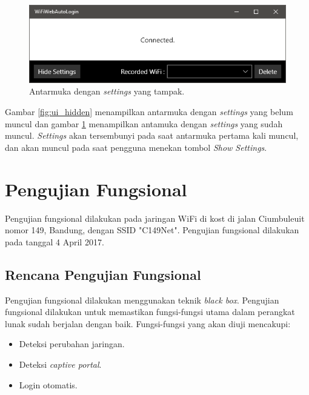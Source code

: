 \begin{figure}[!htb]
    \centering
    \includegraphics[scale=0.9]{Gambar/ui_shown.png}
    \caption[Antarmuka dengan \textit{settings} yang tampak.]{Antarmuka dengan \textit{settings} yang tampak.} 
    \label{fig:ui_shown}
\end{figure}

Gambar \ref{fig:ui_hidden} menampilkan antarmuka dengan \textit{settings} yang belum muncul dan gambar \ref{fig:ui_shown} menampilkan antamuka dengan \textit{settings} yang sudah muncul. \textit{Settings} akan tersembunyi pada saat antarmuka pertama kali muncul, dan akan muncul pada saat pengguna menekan tombol \textit{Show Settings}.



\section{Pengujian Fungsional}
\label{sec:pengujian_fungsional}

Pengujian fungsional dilakukan pada jaringan WiFi di kost di jalan Ciumbuleuit nomor 149, Bandung, dengan SSID "C149Net". Pengujian fungsional dilakukan pada tanggal 4 April 2017.

\subsection{Rencana Pengujian Fungsional}
\label{subsec:rencana_pengujian_fungsional}

Pengujian fungsional dilakukan menggunakan teknik \textit{black box}. Pengujian fungsional dilakukan untuk memastikan fungsi-fungsi utama dalam perangkat lunak sudah berjalan dengan baik. Fungsi-fungsi yang akan diuji mencakupi:

\begin{itemize}
    \item{Deteksi perubahan jaringan.}
    \item{Deteksi \textit{captive portal}.}
    \item{Login otomatis.}
\end{itemize}


